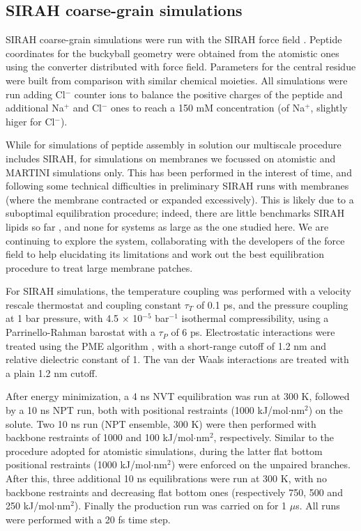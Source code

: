 \subsection{SIRAH coarse-grain simulations}
SIRAH coarse-grain simulations were run with the SIRAH force field \citep{Machado2018}. Peptide coordinates for the buckyball geometry were obtained from the atomistic ones using the converter distributed with force field. Parameters for the central residue were built from comparison with similar chemical moieties. All simulations were run adding Cl$^-$ counter ions to balance the positive charges of the peptide and additional Na$^+$  and Cl$^-$ ones to reach a 150 mM concentration (of Na$^+$, slightly higer for Cl$^-$).

While for simulations of peptide assembly in solution our multiscale procedure includes SIRAH, for simulations on membranes we focussed on atomistic and MARTINI simulations only. This has been performed in the interest of time, and following some technical difficulties in preliminary SIRAH runs with membranes (where the membrane contracted or expanded excessively).
%
This is likely due to a suboptimal equilibration procedure; indeed, there are little benchmarks SIRAH lipids so far \citep{Barrera2019}, and none for systems as large as the one studied here. We are continuing to explore the system, collaborating with the developers of the force field to help elucidating its limitations and work out the best equilibration procedure to treat large membrane patches.

For SIRAH simulations, the temperature coupling was performed with a velocity rescale thermostat \citep{Bussi2007} and coupling constant $\tau _T$ of 0.1 ps, and the pressure coupling at 1 bar pressure, with 4.5 $\times$ 10$^{-5}$ bar$^{-1}$ isothermal compressibility, using a Parrinello-Rahman barostat \citep{Parrinello1981} with a $\tau _P$ of 6 ps. Electrostatic interactions were treated using the PME algorithm \citep{Essmann1995}, with a short-range cutoff of 1.2 nm and relative dielectric constant of 1. The van der Waals interactions are treated with a plain 1.2 nm cutoff.

After energy minimization, a 4 ns NVT equilibration was run at 300 K, followed by a 10 ns NPT run, both with positional restraints (1000 kJ/mol$\cdot$nm$^2$) on the solute. Two 10 ns run (NPT ensemble, 300 K) were then performed with backbone restraints of 1000 and 100 kJ/mol$\cdot$nm$^2$, respectively. Similar to the procedure adopted for atomistic simulations, during the latter flat bottom positional restraints (1000 kJ/mol$\cdot$nm$^2$) were enforced on the unpaired branches. After this, three additional 10 ns equilibrations were run at 300 K, with no backbone restraints and decreasing flat bottom ones (respectively 750, 500 and 250 kJ/mol$\cdot$nm$^2$). Finally the production run was carried on for 1 $\mu$s. All runs were performed with a 20 fs time step.

